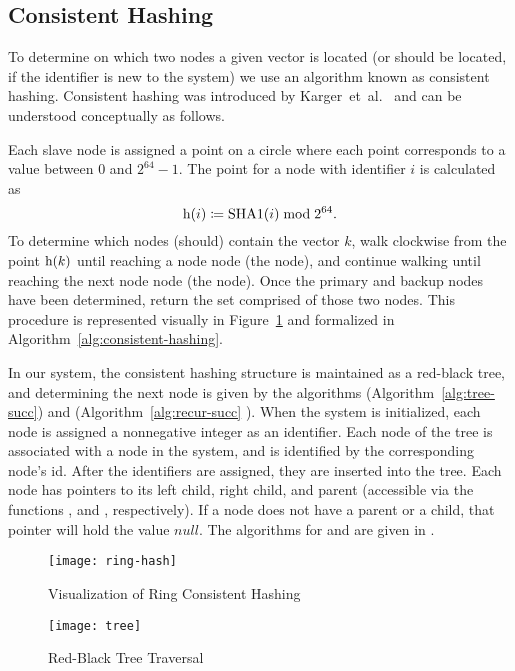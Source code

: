\subsection{Consistent Hashing}
To determine on which two nodes a given vector is located (or should be
located, if the identifier is new to the system) we use an algorithm known as
consistent hashing. Consistent hashing was introduced by
Karger~et~al.~\cite{karger1997} and can be understood conceptually as follows.
\par
Each slave node is assigned a point on a circle where each point corresponds
to a value between \(0\) and \(2^{64} - 1\). The point for a node with
identifier \(i\) is calculated as
\begin{equation*}
    \mathrm{h}(i) \coloneqq \mathrm{SHA1}(i) \bmod{2^{64}}.
\end{equation*}
To determine which nodes (should) contain the vector \(k\), walk clockwise
from the point \(\mathrm{h}(k)\) until reaching a node node (the
 node), and continue walking until reaching the next node node
(the  node). Once the primary and backup nodes have been
determined, return the set comprised of those two nodes. This procedure is
represented visually in Figure~\ref{fig:ring-hash-process} and formalized in
Algorithm~\ref{alg:consistent-hashing}.
%
\par
In our system, the consistent hashing structure is maintained as a red-black
tree, and determining the next node is given by the algorithms
 (Algorithm~\ref{alg:tree-succ}) and
 (Algorithm~\ref{alg:recur-succ}
\cite{bstPredecessorSuccessor}). When the system is initialized, each node
is assigned a nonnegative integer as an identifier. Each node of the tree is
associated with a node in the system, and is identified by the corresponding
node's id. After the identifiers are assigned, they are inserted into the
tree. Each node has pointers to its left child, right child, and parent
(accessible via the functions ,  and
, respectively). If a node does not have a parent or a child,
that pointer will hold the value \(null\). The algorithms for
 and  are given in \cite{cormen2009}.
%
\begin{figure}
    \centering
    \texttt{[image: ring-hash]}
    \caption{Visualization of Ring Consistent Hashing}
    \label{fig:ring-hash-process}
\end{figure}
%
\begin{figure}
    \centering
    \texttt{[image: tree]}
    \caption{Red-Black Tree Traversal}
    \label{fig:tree-traversal}
\end{figure}
